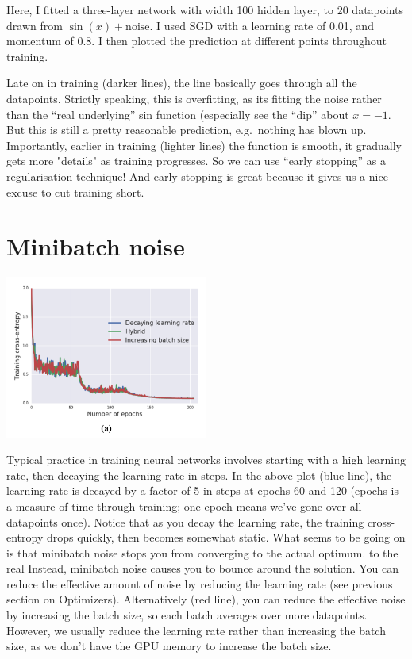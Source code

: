 \documentclass{article}
\newcommand{\0}{\mathbf{0}}
\begin{document}
Here, I fitted a three-layer network with width 100 hidden layer, to 20 datapoints drawn from $\sin(x) + \text{noise}$.
I used SGD with a learning rate of 0.01, and momentum of 0.8.
I then plotted the prediction at different points throughout training.

Late on in training (darker lines), the line basically goes through all the datapoints. Strictly speaking, this is overfitting, as its fitting the noise rather than the ``real underlying'' sin function (especially see the ``dip'' about $x=-1$.  
But this is still a pretty reasonable prediction, e.g.\ nothing has blown up.
Importantly, earlier in training (lighter lines) the function is smooth, it gradually gets more "details" as training progresses.
So we can use ``early stopping'' as a regularisation technique!
And early stopping is great because it gives us a nice excuse to cut training short.

\newpage
\section{Minibatch noise}

\begin{center}
  \includegraphics[width=0.5\textwidth]{schedule.png}
\end{center}

Typical practice in training neural networks involves starting with a high learning rate, then decaying the learning rate in steps.
In the above plot (blue line), the learning rate is decayed by a factor of 5 in steps at epochs 60 and 120 (epochs is a measure of time through training; one epoch means we've gone over all datapoints once).
Notice that as you decay the learning rate, the training cross-entropy drops quickly, then becomes somewhat static.
What seems to be going on is that minibatch noise stops you from converging to the actual optimum. to the real
Instead, minibatch noise causes you to bounce around the solution.
You can reduce the effective amount of noise by reducing the learning rate (see previous section on Optimizers).
Alternatively (red line), you can reduce the effective noise by increasing the batch size, so each batch averages over more datapoints.
However, we usually reduce the learning rate rather than increasing the batch size, as we don't have the GPU memory to increase the batch size.
\end{document}
